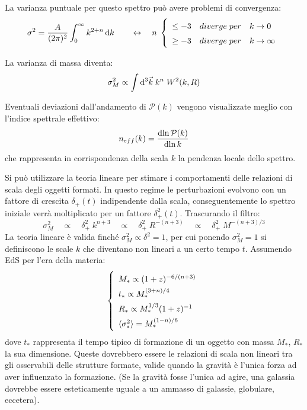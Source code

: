 La varianza puntuale per questo spettro può avere problemi di convergenza:
\begin{equation} \sigma^2 = \frac{A}{(2\pi)^2}\int_0^\infty  k^{2+n} \d{k} \qquad \leftrightarrow \quad n\; \left\{
    \begin{array}{lll}
    \leq -3 & diverge\; per &k\rightarrow 0 \\
    \geq -3 & diverge\; per & k\rightarrow \infty
\end{array}\right.
\end{equation}

La varianza di massa diventa:
\begin{equation}
    \sigma_M^2 \propto \int \operatorname{d}\!{^3 \vec{k}}\; k^n\; W^2(k,R)
\end{equation}

Eventuali deviazioni dall'andamento di $\mathcal{P}(k)$ vengono visualizzate meglio con l'indice spettrale effettivo:
\begin{equation}
    n_{eff}(k)=\frac{\operatorname{d}\!{\ln \mathcal{P}(k)}}{\operatorname{d}\!{\ln k}}
\end{equation}
che rappresenta in corrispondenza della scala $k$ la pendenza locale dello spettro.

\vspace{1em}
Si può utilizzare la teoria lineare per stimare i comportamenti delle relazioni di scala degli oggetti formati. In questo regime le perturbazioni evolvono con un fattore di crescita $\delta_+ (t)$ indipendente dalla scala, conseguentemente lo spettro iniziale verrà moltiplicato per un fattore $\delta_+^2 (t)$. Trascurando il filtro:
$$
\sigma_M^2 \quad\propto\quad \delta_+^2\; k^{n+3} \quad\propto\quad \delta_+^2\;  R^{-(n+3)} \quad\propto\quad \delta_+^2\;  M^{-(n+3)/3}
$$
La teoria lineare è valida finché $\sigma_M^2 \propto \delta^2 = 1$, per cui ponendo $\sigma_M^2 =1$ si definiscono le scale $k$ che diventano non lineari a un certo tempo $t$. Assumendo EdS per l'era della materia:
\begin{equation}\left\{
    \def\arraystretch{1.5}
        \begin{array}{l}
        M_* \propto (1+z)^{-6/(n+3)} \\
        t_* \propto M_* ^{(3+n)/4} \\
        R_* \propto M_*^{1/3}(1+z)^{-1}\\
        \langle \sigma_*^2 \rangle = M_*^{(1-n)/6}
    \end{array}\right. 
\end{equation}
dove $t_*$ rappresenta il tempo tipico di formazione di un oggetto con massa $M_*$, $R_*$ la sua dimensione. Queste dovrebbero essere le relazioni di scala non lineari tra gli osservabili delle strutture formate, valide quando la gravità è l’unica forza ad
aver influenzato la formazione. (Se la gravità fosse l'unica ad agire, una galassia dovrebbe essere esteticamente uguale a un ammasso di galassie, globulare, eccetera). 

